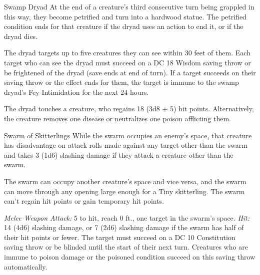 \documentclass[10pt,a4paper,twoside,bg=print,twocolumn,openany,nodeprecatedcode]{dndbook}
\begin{document}
\begin{DndMonster}[float=t]{Swamp Dryad}
At the end of a creature's third consecutive turn being grappled in this way, they become petrified and turn into a hardwood statue. The petrified condition ends for that creature if the dryad uses an action to end it, or if the dryad dies.

The dryad targets up to five creatures they can see within 30 feet of them. Each target who can see the dryad must succeed on a DC 18 Wisdom saving throw or be frightened of the dryad (save ends at end of turn). If a target succeeds on their saving throw or the effect ends for them, the target is immune to the swamp dryad's Fey Intimidation for the next 24 hours.

The dryad touches a creature, who regains 18 (3d8 + 5) hit points. Alternatively, the creature removes one disease or neutralizes one poison afflicting them.

\end{DndMonster}



\begin{DndMonster}[float=t]{Swarm of Skitterlings}
\DndMonsterBasics[
armor-class = {13},
hit-points = {\DndDice{8d8}},
speed = {30 ft., fly 60 ft.}
]
\DndMonsterAbilityScores[
 str = 10,
 dex = 16,
 con = 10,
 int = 3,
 wis = 12,
 cha = 5
]
\DndMonsterDetails[
damage-resistances = {bludgeoning, piercing, slashing},
condition-immunities = {charmed, dazed, frightened, grappled, paralyzed, petrified, prone, restrained, stunned},
senses = {darkvision 60 ft., passive perception 11},
challenge = 2,
]
While the swarm occupies an enemy's space, that creature has disadvantage on attack rolls made against any target other than the swarm and takes 3 (1d6) slashing damage if they attack a creature other than the swarm.

The swarm can occupy another creature's space and vice versa, and the swarm can move through any opening large enough for a Tiny skitterling. The swarm can't regain hit points or gain temporary hit points.

\textsl{Melee Weapon Attack:} 5 to hit, reach 0 ft., one target in the swarm's space. \textsl{Hit:} 14 (4d6) slashing damage, or 7 (2d6) slashing damage if the swarm has half of their hit points or fewer. The target must succeed on a DC 10 Constitution saving throw or be blinded until the start of their next turn. Creatures who are immune to poison damage or the poisoned condition succeed on this saving throw automatically.

\end{DndMonster}
\end{document}

